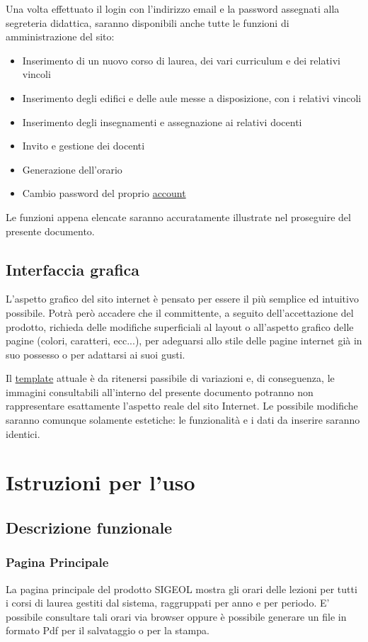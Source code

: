 \documentclass[11pt,a4paper]{article}
\begin{document}
\bigskip
Una volta effettuato il login con l'indirizzo email e la password assegnati alla segreteria didattica, saranno disponibili anche tutte le funzioni di amministrazione del sito:
\begin{itemize}
 \item Inserimento di un nuovo corso di laurea, dei vari curriculum e dei relativi vincoli
 \item Inserimento degli edifici e delle aule messe a disposizione, con i relativi vincoli
 \item Inserimento degli insegnamenti e assegnazione ai relativi docenti
 \item Invito e gestione dei docenti
 \item Generazione dell'orario
 \item Cambio password del proprio \underline{account}
\end{itemize}
Le funzioni appena elencate saranno accuratamente illustrate nel proseguire del presente documento.
\subsection{Interfaccia grafica}
L'aspetto grafico del sito internet è pensato per essere il più semplice ed intuitivo possibile. Potrà però accadere che il committente, a seguito dell'accettazione del prodotto, richieda delle modifiche superficiali al layout o all'aspetto grafico delle pagine (colori, caratteri, ecc...), per adeguarsi allo stile delle pagine internet già in suo possesso o per adattarsi ai suoi gusti.

Il \underline{template} attuale è da ritenersi passibile di variazioni e, di conseguenza, le immagini consultabili all'interno del presente documento potranno non rappresentare esattamente l'aspetto reale del sito Internet. Le possibile modifiche saranno comunque solamente estetiche: le funzionalità e i dati da inserire saranno identici.
\section{Istruzioni per l'uso}
\subsection{Descrizione funzionale}
\subsubsection{Pagina Principale}
La pagina principale del prodotto SIGEOL mostra gli orari delle lezioni per tutti i corsi di laurea gestiti dal sistema, raggruppati per anno e per periodo. E' possibile consultare tali orari via browser oppure è possibile generare un file in formato Pdf per il salvataggio o per la stampa.
\end{document}
